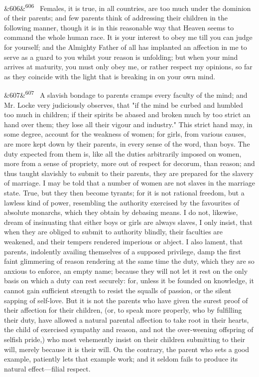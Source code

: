 \documentclass[12pt]{article}
\newcommand{\para}[1][]{\par\noindent\ifx&#1&\else\textsuperscript{\footnotesize #1}~\fi}
\begin{document}
\para[606] Females, it is true, in all countries, are too much under the dominion of their parents; and few parents think of addressing their children in the following manner, though it is in this reasonable way that Heaven seems to command the whole human race. It is your interest to obey me till you can judge for yourself; and the Almighty Father of all has implanted an affection in me to serve as a guard to you whilst your reason is unfolding; but when your mind arrives at maturity, you must only obey me, or rather respect my opinions, so far as they coincide with the light that is breaking in on your own mind.

\para[607] A slavish bondage to parents cramps every faculty of the mind; and Mr. Locke very judiciously observes, that "if the mind be curbed and humbled too much in children; if their spirits be abased and broken much by too strict an hand over them; they lose all their vigour and industry." This strict hand may, in some degree, account for the weakness of women; for girls, from various causes, are more kept down by their parents, in every sense of the word, than boys. The duty expected from them is, like all the duties arbitrarily imposed on women, more from a sense of propriety, more out of respect for decorum, than reason; and thus taught slavishly to submit to their parents, they are prepared for the slavery of marriage. I may be told that a number of women are not slaves in the marriage state. True, but they then become tyrants; for it is not rational freedom, but a lawless kind of power, resembling the authority exercised by the favourites of absolute monarchs, which they obtain by debasing means. I do not, likewise, dream of insinuating that either boys or girls are always slaves, I only insist, that when they are obliged to submit to authority blindly, their faculties are weakened, and their tempers rendered imperious or abject. I also lament, that parents, indolently availing themselves of a supposed privilege, damp the first faint glimmering of reason rendering at the same time the duty, which they are so anxious to enforce, an empty name; because they will not let it rest on the only basis on which a duty can rest securely: for, unless it be founded on knowledge, it cannot gain sufficient strength to resist the squalls of passion, or the silent sapping of self-love. But it is not the parents who have given the surest proof of their affection for their children, (or, to speak more properly, who by fulfilling their duty, have allowed a natural parental affection to take root in their hearts, the child of exercised sympathy and reason, and not the over-weening offspring of selfish pride,) who most vehemently insist on their children submitting to their will, merely because it is their will. On the contrary, the parent who sets a good example, patiently lets that example work; and it seldom fails to produce its natural effect---filial respect.
\end{document}
